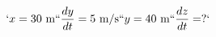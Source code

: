 \documentclass[preview]{standalone}
\begin{document}
\begin{align*}
`x = 30 \text{ m}`
`\frac{dy}{dt} = 5 \text{ m/s}`
`y = 40 \text{ m}`
`\frac{dz}{dt} = ?`
\end{align*}
\end{document}
